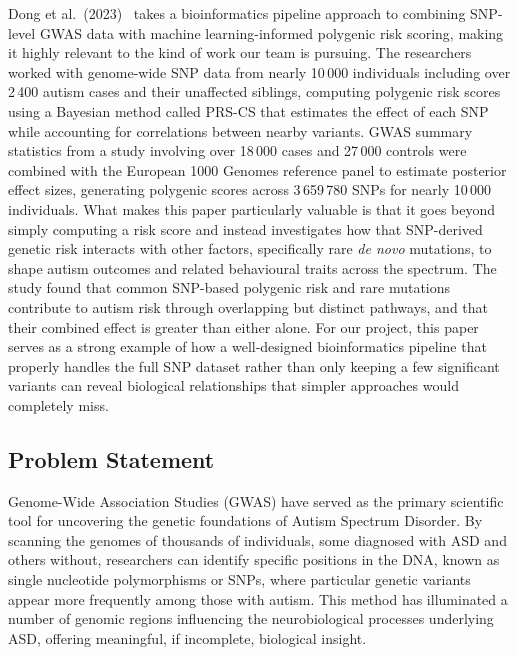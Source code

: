 Dong et al.\ (2023)~\cite{dong2023} takes a bioinformatics pipeline
approach to combining SNP-level GWAS data with machine
learning-informed polygenic risk scoring, making it highly relevant to
the kind of work our team is pursuing. The researchers worked with
genome-wide SNP data from nearly 10\,000 individuals including over
2\,400 autism cases and their unaffected siblings, computing polygenic
risk scores using a Bayesian method called PRS-CS that estimates the
effect of each SNP while accounting for correlations between nearby
variants. GWAS summary statistics from a study involving over 18\,000
cases and 27\,000 controls were combined with the European 1000
Genomes reference panel to estimate posterior effect sizes, generating
polygenic scores across 3\,659\,780 SNPs for nearly 10\,000
individuals. What makes this paper particularly valuable is that it
goes beyond simply computing a risk score and instead investigates how
that SNP-derived genetic risk interacts with other factors,
specifically rare \textit{de novo} mutations, to shape autism outcomes
and related behavioural traits across the spectrum. The study found
that common SNP-based polygenic risk and rare mutations contribute to
autism risk through overlapping but distinct pathways, and that their
combined effect is greater than either alone. For our project, this
paper serves as a strong example of how a well-designed bioinformatics
pipeline that properly handles the full SNP dataset rather than only
keeping a few significant variants can reveal biological relationships
that simpler approaches would completely miss.

\subsection{Problem Statement}

Genome-Wide Association Studies (GWAS) have served as the primary
scientific tool for uncovering the genetic foundations of Autism
Spectrum Disorder. By scanning the genomes of thousands of
individuals, some diagnosed with ASD and others without, researchers
can identify specific positions in the DNA, known as single nucleotide
polymorphisms or SNPs, where particular genetic variants appear more
frequently among those with autism. This method has illuminated a
number of genomic regions influencing the neurobiological processes
underlying ASD, offering meaningful, if incomplete, biological insight.

